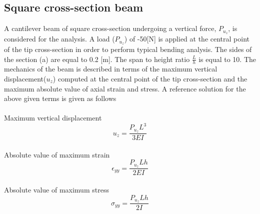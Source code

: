 \documentclass[a4paper,12pt]{article}
\begin{document}
\subsection*{Square cross-section beam}
\indent\indent\indent\indent A cantilever beam of square cross-section undergoing a vertical force, $P_{u_{z}}$, is considered for the analysis. A load ($P_{u_{z}}$) of -50[N] is applied at the central point of the tip cross-section in order to perform typical bending analysis. The sides of the section (a) are equal to 0.2 [m]. The span to height ratio $\frac{L}{h}$ is equal to 10. The mechanics of the beam is described in terms of the maximum vertical displacement($u_{z}$) computed at the central point of the tip cross-section and the maximum absolute value of axial strain and stress. A reference solution for the above given terms is given as follows\\
\\
Maximum vertical displacement 
\begin{equation}
u_{z} = \frac{P_{u_{z}} L^{3}}{3 E I}
\label{u_z}
\end{equation}
\\
Absolute value of maximum strain
\begin{equation}
\epsilon_{yy} = \frac{P_{u_{z}} L h}{2 E I}
\end{equation}
\\
Absolute value of maximum stress
\begin{equation}
\sigma_{yy} = \frac{P_{u_{z}} L h}{2 I}
\end{equation}
\end{document}
